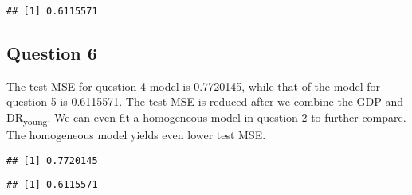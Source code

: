 \documentclass[
]{article}
\newenvironment{Shaded}{\begin{snugshade}}{\end{snugshade}}
\newcommand{\AttributeTok}[1]{\textcolor[rgb]{0.77,0.63,0.00}{#1}}
\newcommand{\DecValTok}[1]{\textcolor[rgb]{0.00,0.00,0.81}{#1}}
\newcommand{\FunctionTok}[1]{\textcolor[rgb]{0.00,0.00,0.00}{#1}}
\newcommand{\NormalTok}[1]{#1}
\newcommand{\OtherTok}[1]{\textcolor[rgb]{0.56,0.35,0.01}{#1}}
\newcommand{\SpecialCharTok}[1]{\textcolor[rgb]{0.00,0.00,0.00}{#1}}
\begin{document}
\begin{Shaded}
\end{Shaded}

\begin{verbatim}
## [1] 0.6115571
\end{verbatim}

\hypertarget{question-6}{%
\subsection{Question 6}\label{question-6}}

The test MSE for question 4 model is 0.7720145, while that of the model
for question 5 is 0.6115571. The test MSE is reduced after we combine
the GDP and DR\textsubscript{young}. We can even fit a homogeneous model
in question 2 to further compare. The homogeneous model yields even
lower test MSE.

\begin{Shaded}
\end{Shaded}

\begin{verbatim}
## [1] 0.7720145
\end{verbatim}

\begin{Shaded}
\end{Shaded}

\begin{verbatim}
## [1] 0.6115571
\end{verbatim}
\end{document}
